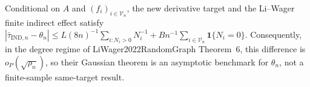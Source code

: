 Conditional on \(A\) and \((f_i)_{i\in\mathcal V_n}\), the new derivative target and the Li--Wager finite indirect effect satisfy \( |\bar\tau_{\mathrm{IND},n}-\theta_n|\le L(8n)^{-1}\sum_{i:N_i>0}N_i^{-1}+Bn^{-1}\sum_{i\in\mathcal V_n}\mathbf 1\{N_i=0\}\). Consequently, in the degree regime of LiWager2022RandomGraph Theorem~6, this difference is \(o_P(\sqrt{\rho_n})\), so their Gaussian theorem is an asymptotic benchmark for \(\theta_n\), not a finite-sample same-target result.